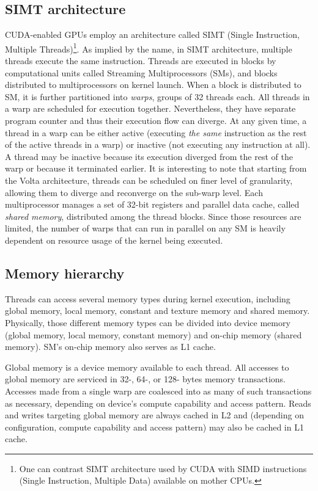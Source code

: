 \subsection{SIMT architecture}
CUDA-enabled GPUs employ an architecture called SIMT (Single Instruction, Multiple Threads)\footnote{One can contrast SIMT architecture used by CUDA with SIMD instructions (Single Instruction, Multiple  Data) available on mother CPUs.}. As implied by the name, in SIMT architecture, multiple threads execute the same instruction. Threads are executed in blocks  by computational units called Streaming Multiprocessors (SMs), and blocks distributed to multiprocessors on kernel launch. When a block is distributed to SM, it is further partitioned into \emph{warps}, groups of 32 threads each. All threads in a warp are scheduled for execution together. Nevertheless, they have separate program counter and thus their execution flow can diverge. At any given time, a  thread in a warp can be either active (executing \emph{the same} instruction as the rest of the active threads in a warp) or inactive (not executing any instruction at all). A thread may be inactive because its execution diverged from the rest of the warp or because it terminated earlier. It is interesting to note that starting from the Volta architecture, threads can be scheduled on finer level of granularity, allowing them to diverge and reconverge on the sub-warp level. Each multiprocessor manages a set of 32-bit registers and parallel data cache, called \emph{shared memory}, distributed among the thread blocks. Since those resources are limited, the number of warps that can run in parallel on any SM is heavily dependent on resource usage of the kernel being executed.

\subsection{Memory hierarchy}

Threads can access several memory types during kernel execution, including global memory, local memory, constant and texture memory and shared memory. Physically, those different memory types can be divided into device memory (global memory, local memory, constant memory) and on-chip memory (shared memory). SM's on-chip memory also serves as L1 cache.

Global memory is a device memory available to each thread. All accesses to global memory are serviced in 32-, 64-, or 128- bytes memory transactions. Accesses made from a single warp are coalesced into as many of such transactions as necessary, depending on device's compute capability and access pattern. Reads and writes targeting global memory are always cached in L2 and (depending on configuration, compute capability and access pattern) may also be cached in L1 cache.

